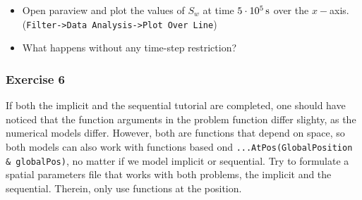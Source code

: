 \begin{itemize}
 \item Open paraview and plot the values of $S_w$ at time $\unit[5 \cdot 10^5]{s}$
 over the $x-$axis.\\ (\texttt{Filter->Data Analysis->Plot Over Line})
 \item What happens without any time-step restriction?
\end{itemize}

\subsubsection{Exercise 6}
If both the implicit and the sequential tutorial are completed, one should have
noticed that the function arguments in the problem function differ slighty, as
the numerical models differ. However, both are functions that depend on space,
so both models can also work with functions based ond \mbox{\texttt{...AtPos(GlobalPosition \& globalPos)}},
no matter if we model implicit or sequential. Try to formulate a spatial parameters
file that works with both problems, the implicit and the sequential. Therein, only
use functions at the position.

